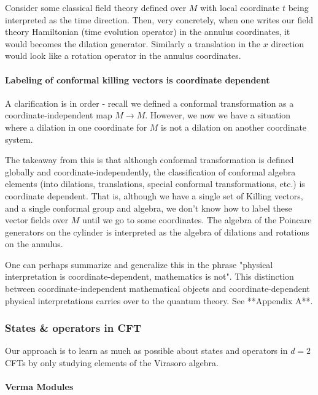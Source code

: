 Consider some classical field theory defined over $M$ with local coordinate $t$ being interpreted as the time direction.  Then, very concretely, when one writes our field theory Hamiltonian (time evolution operator) in the annulus coordinates, it would becomes the dilation generator. Similarly a translation in the $x$ direction would look like a rotation operator in the annulus coordinates.



\paragraph{ Labeling of conformal killing vectors is coordinate dependent}

A clarification is in order - recall we defined a conformal transformation as a coordinate-independent map $M \to M$. However, we now we have a situation where a dilation in one coordinate for $M$ is not a dilation on another coordinate system.

The takeaway from this is that although conformal transformation is defined globally and coordinate-independently, the classification of conformal algebra elements (into dilations, translations, special conformal transformations, etc.) is coordinate dependent. That is, although we have a single set of Killing vectors, and a single conformal group and algebra, we don't know how to label these vector fields over $M$ until we go to some coordinates. The algebra of the Poincare generators on the cylinder is interpreted as the algebra of dilations and rotations on the annulus.

One can perhaps summarize and generalize this in the phrase "physical interpretation is coordinate-dependent, mathematics is not". This distinction between coordinate-independent mathematical objects and coordinate-dependent physical interpretations carries over to the quantum theory. See **Appendix A**. 



\subsubsection{ States \& operators in CFT}

Our approach is to learn as much as possible about states and operators in $d=2$ CFTs by only studying elements of the Virasoro algebra.

\paragraph{ Verma Modules}

